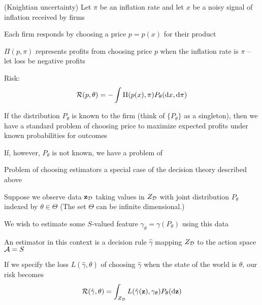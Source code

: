 \begin{frame}

    \vspace{2em}
    \Eg (Knightian uncertainty)
    Let $\pi$ be an inflation rate and let 
    $x$ be a noisy signal of inflation received by firms
    
    Each firm responds
    by choosing a price $p = p(x)$ for their product
    
    $\Pi(p,
    \pi)$ represents profits from choosing price $p$ when the inflation
    rate is $\pi$ -- let loss be negative profits
    
    Risk:
    \begin{equation*}
        \mathcal R(p, \theta) 
        = - \int \Pi(p(x), \pi) P_\theta(\mathop{}\!\mathrm{d} x, \mathop{}\!\mathrm{d} \pi)
    \end{equation*}
    
    \vspace{.7em}
    If the distribution $P_\theta$ is known to the firm (think of
    $\{P_\theta\}$ as a singleton), then we have a standard problem of
    choosing price to maximize expected profits under known probabilities for
    outcomes
    
    If, however, $P_\theta$ is not known, we have a problem of

\end{frame}

\begin{frame}

    \vspace{2em}
    Problem of choosing estimators a special case of the decision theory
    described above
    
    \vspace{.7em}
    Suppose we observe data $\mathbf{z}_{\mathcal D}$ taking values in
    $Z_{\mathcal D}$ with joint distribution $P_\theta$ indexed by $\theta \in \Theta$
    (The set $\Theta$ can be infinite dimensional.)
    
    We wish to estimate some $S$-valued feature $\gamma_\theta = \gamma(P_\theta)$
    using this data
    
\end{frame}

\begin{frame}

    \vspace{2em}
    An estimator in this context is a decision rule $\hat
    \gamma$ mapping $Z_{\mathcal D}$ to the action space $\mathcal A = S$
    
    \vspace{.7em}
    If we specify the
    loss $L(\hat \gamma, \theta)$ of choosing $\hat \gamma$ when the state of the
    world is $\theta$, our risk becomes
    \begin{equation*}
        \label{eq:norage}
        \mathcal R(\hat \gamma, \theta) 
        = \int_{Z_{\mathcal D}} L(\hat \gamma({\mathbf z}), \gamma_\theta) P_\theta(\mathop{}\!\mathrm{d} {\mathbf z})
    \end{equation*}

\end{frame}

